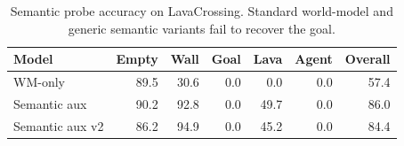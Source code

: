 \begin{table}[t]
\centering
\small
\begin{tabular}{lrrrrrr}
\toprule
Model & Empty & Wall & Goal & Lava & Agent & Overall \\
\midrule
WM-only & 89.5 & 30.6 & 0.0 & 0.0 & 0.0 & 57.4 \\
Semantic aux & 90.2 & 92.8 & 0.0 & 49.7 & 0.0 & 86.0 \\
Semantic aux v2 & 86.2 & 94.9 & 0.0 & 45.2 & 0.0 & 84.4 \\
\bottomrule
\end{tabular}
\caption{Semantic probe accuracy on LavaCrossing. Standard world-model and generic semantic variants fail to recover the goal.}
\label{tab:lava_probe}
\end{table}
